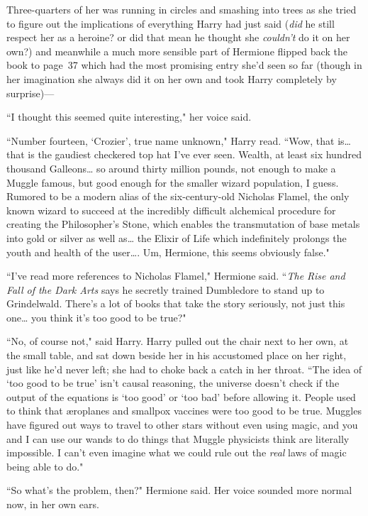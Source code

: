 Three-quarters of her was running in circles and smashing into trees as she tried to figure out the implications of everything Harry had just said (\emph{did} he still respect her as a heroine? or did that mean he thought she \emph{couldn't} do it on her own?) and meanwhile a much more sensible part of Hermione flipped back the book to page~37 which had the most promising entry she'd seen so far (though in her imagination she always did it on her own and took Harry completely by surprise)—

``I thought this seemed quite interesting," her voice said.

``Number fourteen, `Crozier', true name unknown," Harry read. ``Wow, that is{\ldots} that is the gaudiest checkered top hat I've ever seen. Wealth, at least six hundred thousand Galleons{\ldots} so around thirty million pounds, not enough to make a Muggle famous, but good enough for the smaller wizard population, I guess. Rumored to be a modern alias of the six-century-old Nicholas Flamel, the only known wizard to succeed at the incredibly difficult alchemical procedure for creating the Philosopher's Stone, which enables the transmutation of base metals into gold or silver as well as{\ldots} the Elixir of Life which indefinitely prolongs the youth and health of the user{\ldots}. Um, Hermione, this seems obviously false."

``I've read more references to Nicholas Flamel," Hermione said. ``\emph{The Rise and Fall of the Dark Arts} says he secretly trained Dumbledore to stand up to Grindelwald. There's a lot of books that take the story seriously, not just this one{\ldots} you think it's too good to be true?"

``No, of course not," said Harry. Harry pulled out the chair next to her own, at the small table, and sat down beside her in his accustomed place on her right, just like he'd never left; she had to choke back a catch in her throat. ``The idea of `too good to be true' isn't causal reasoning, the universe doesn't check if the output of the equations is `too good' or `too bad' before allowing it. People used to think that æroplanes and smallpox vaccines were too good to be true. Muggles have figured out ways to travel to other stars without even using magic, and you and I can use our wands to do things that Muggle physicists think are literally impossible. I can't even imagine what we could rule out the \emph{real} laws of magic being able to do."

``So what's the problem, then?" Hermione said. Her voice sounded more normal now, in her own ears.

